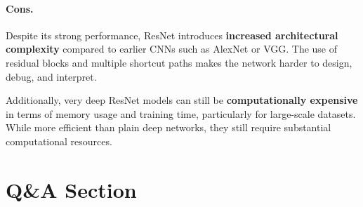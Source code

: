 \documentclass{article}
\begin{document}
\paragraph{Cons.}
Despite its strong performance, ResNet introduces \textbf{increased architectural 
complexity} compared to earlier CNNs such as AlexNet or VGG. The use of residual 
blocks and multiple shortcut paths makes the network harder to design, debug, 
and interpret.

Additionally, very deep ResNet models can still be \textbf{computationally 
expensive} in terms of memory usage and training time, particularly for 
large-scale datasets. While more efficient than plain deep networks, they still 
require substantial computational resources.


\section{Q\&A Section}
\end{document}

